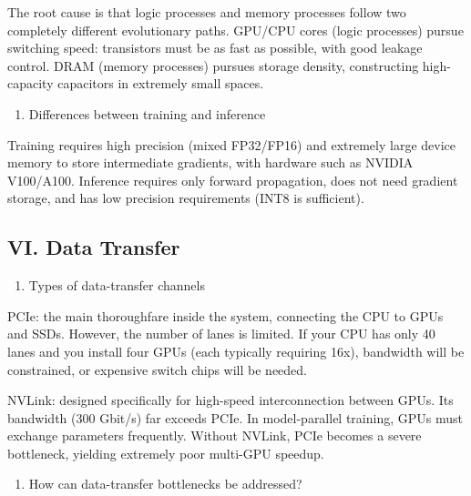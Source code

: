 The root cause is that logic processes and memory processes follow two completely different evolutionary paths. GPU/CPU cores (logic processes) pursue switching speed: transistors must be as fast as possible, with good leakage control. DRAM (memory processes) pursues storage density, constructing high-capacity capacitors in extremely small spaces.

\begin{enumerate}
\def\labelenumi{\arabic{enumi}.}
\setcounter{enumi}{2}
\tightlist
\item
  Differences between training and inference
\end{enumerate}

Training requires high precision (mixed FP32/FP16) and extremely large device memory to store intermediate gradients, with hardware such as NVIDIA V100/A100. Inference requires only forward propagation, does not need gradient storage, and has low precision requirements (INT8 is sufficient).

\hypertarget{vi.-data-transfer}{%
\subsection{VI. Data Transfer}\label{vi.-data-transfer}}

\begin{enumerate}
\def\labelenumi{\arabic{enumi}.}
\tightlist
\item
  Types of data-transfer channels
\end{enumerate}

PCIe: the main thoroughfare inside the system, connecting the CPU to GPUs and SSDs. However, the number of lanes is limited. If your CPU has only 40 lanes and you install four GPUs (each typically requiring 16x), bandwidth will be constrained, or expensive switch chips will be needed.

NVLink: designed specifically for high-speed interconnection between GPUs. Its bandwidth (300 Gbit/s) far exceeds PCIe. In model-parallel training, GPUs must exchange parameters frequently. Without NVLink, PCIe becomes a severe bottleneck, yielding extremely poor multi-GPU speedup.

\begin{enumerate}
\def\labelenumi{\arabic{enumi}.}
\setcounter{enumi}{1}
\tightlist
\item
  How can data-transfer bottlenecks be addressed?
\end{enumerate}

